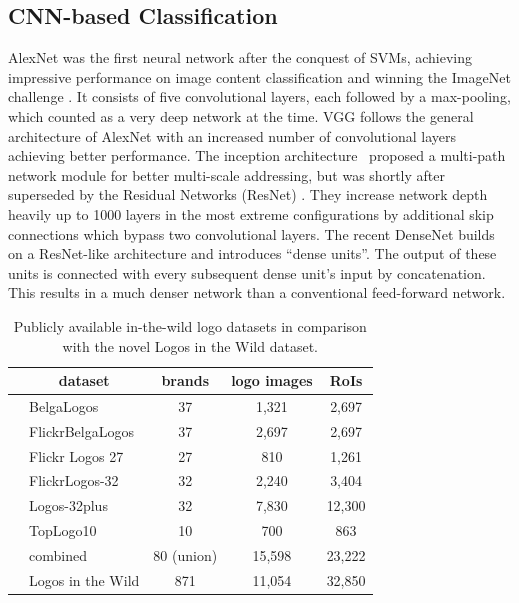 \documentclass[a4paper,twoside]{article}
\newcommand{\vertboxs}[1]{\rotatebox{90}{\parbox{14mm}{\centering #1}}}
\newcommand{\vertboxt}[1]{\rotatebox{90}{\parbox{10mm}{\centering #1}}}
\begin{document}
\subsection{\acs{CNN}-based Classification}
AlexNet \cite{krizhevsky2012b} was the first neural network after the conquest of \acp{SVM}, achieving impressive performance on image content classification and winning the ImageNet challenge \cite{deng2009}. It consists of five convolutional layers, each followed by a max-pooling, which counted as a very deep network at the time. 
VGG \cite{simonyan2014} follows the general architecture of AlexNet with an increased number of convolutional layers achieving better performance. 
The inception architecture~\cite{szegedy2015} proposed a multi-path network module for better multi-scale addressing, but was shortly after superseded by the Residual Networks (ResNet) \cite{he2015,he2016}. They increase network depth heavily up to 1000 layers in the most extreme configurations by additional skip connections which bypass two convolutional layers. 
The recent DenseNet \cite{huang2016} builds on a ResNet-like architecture and introduces ``dense units''. The output of these units is connected with every subsequent dense unit's input by concatenation. This results in a much denser network than a conventional feed-forward network.


\begin{table}[t]
\centering
\caption{Publicly available in-the-wild logo datasets in comparison with the novel Logos in the Wild dataset.}
\label{tab:logoDatasets}
\begin{small}
\begin{tabular}{cl|ccc}
& \multicolumn{1}{c|}{\textbf{dataset}} & \textbf{brands} & \textbf{logo images} & \textbf{RoIs} \bigstrut[b]\\
\hline
\multirow{8}{*}{\vertboxs{public}} & BelgaLogos \cite{joly2009,letessier2012} & 37 & 1,321 & 2,697 \bigstrut[t] \\
& FlickrBelgaLogos \cite{letessier2012} & 37 & 2,697 & 2,697 \\
& Flickr Logos 27 \cite{kalantidis2011} & 27 & 810 & 1,261 \\
& FlickrLogos-32 \cite{romberg2011} & 32 & 2,240 & 3,404 \\
& Logos-32plus \cite{bianco2015,bianco2017} & 32 & 7,830 & 12,300 \\
& TopLogo10 \cite{su2016} & 10 & 700 & 863 \bigstrut[b] \\
\cline{2-5}
& combined & 80 (union) & 15,598 & 23,222 \bigstrut \\
\hline
\begin{minipage}[c]{0.1cm}\vertboxt{new}\end{minipage} & Logos in the Wild & 871 & 11,054 & 32,850 \bigstrut[t]
\end{tabular}
\end{small}
\end{table}
%
\end{document}
